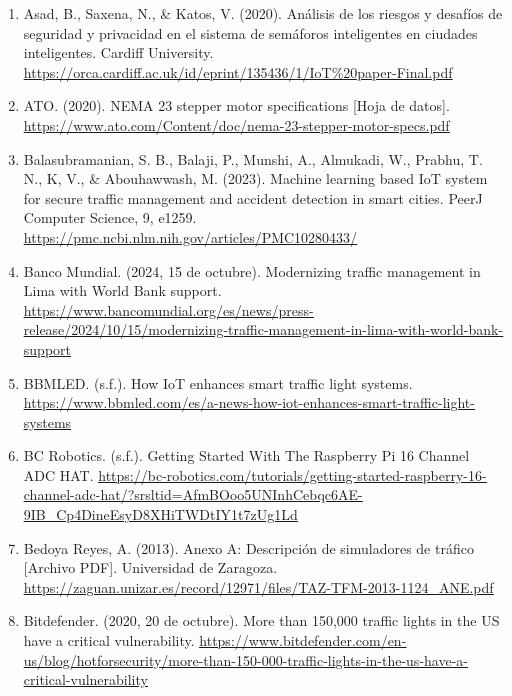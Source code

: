 \begin{enumerate}
\item
  Asad, B., Saxena, N., \& Katos, V. (2020). Análisis de los riesgos y desafíos de seguridad y privacidad en el sistema de semáforos inteligentes en ciudades inteligentes. Cardiff University. \href{https://orca.cardiff.ac.uk/id/eprint/135436/1/IoT\%20paper-Final.pdf}{\ul{https://orca.cardiff.ac.uk/id/eprint/135436/1/IoT\%20paper-Final.pdf}}
\item
  ATO. (2020). NEMA 23 stepper motor specifications {[}Hoja de datos{]}. \href{https://www.ato.com/Content/doc/nema-23-stepper-motor-specs.pdf}{\ul{https://www.ato.com/Content/doc/nema-23-stepper-motor-specs.pdf}}
\item
  Balasubramanian, S. B., Balaji, P., Munshi, A., Almukadi, W., Prabhu, T. N., K, V., \& Abouhawwash, M. (2023). Machine learning based IoT system for secure traffic management and accident detection in smart cities. PeerJ Computer Science, 9, e1259. \href{https://pmc.ncbi.nlm.nih.gov/articles/PMC10280433/}{\ul{https://pmc.ncbi.nlm.nih.gov/articles/PMC10280433/}}
\item
  Banco Mundial. (2024, 15 de octubre). Modernizing traffic management in Lima with World Bank support. \href{https://www.bancomundial.org/es/news/press-release/2024/10/15/modernizing-traffic-management-in-lima-with-world-bank-support}{\ul{https://www.bancomundial.org/es/news/press-release/2024/10/15/modernizing-traffic-management-in-lima-with-world-bank-support}}
\item
  BBMLED. (s.f.). How IoT enhances smart traffic light systems. \href{https://www.bbmled.com/es/a-news-how-iot-enhances-smart-traffic-light-systems}{\ul{https://www.bbmled.com/es/a-news-how-iot-enhances-smart-traffic-light-systems}}
\item
  BC Robotics. (s.f.). Getting Started With The Raspberry Pi 16 Channel ADC HAT. \href{https://bc-robotics.com/tutorials/getting-started-raspberry-16-channel-adc-hat/?srsltid=AfmBOoo5UNInhCebqc6AE-9IB_Cp4DineEsyD8XHiTWDtIY1t7zUg1Ld}{\ul{https://bc-robotics.com/tutorials/getting-started-raspberry-16-channel-adc-hat/?srsltid=AfmBOoo5UNInhCebqc6AE-9IB\_Cp4DineEsyD8XHiTWDtIY1t7zUg1Ld}}
\item
  Bedoya Reyes, A. (2013). Anexo A: Descripción de simuladores de tráfico {[}Archivo PDF{]}. Universidad de Zaragoza. \href{https://zaguan.unizar.es/record/12971/files/TAZ-TFM-2013-1124_ANE.pdf}{\ul{https://zaguan.unizar.es/record/12971/files/TAZ-TFM-2013-1124\_ANE.pdf}}
\item
  Bitdefender. (2020, 20 de octubre). More than 150,000 traffic lights in the US have a critical vulnerability. \href{https://www.bitdefender.com/en-us/blog/hotforsecurity/more-than-150-000-traffic-lights-in-the-us-have-a-critical-vulnerability}{\ul{https://www.bitdefender.com/en-us/blog/hotforsecurity/more-than-150-000-traffic-lights-in-the-us-have-a-critical-vulnerability}}

\end{enumerate}
